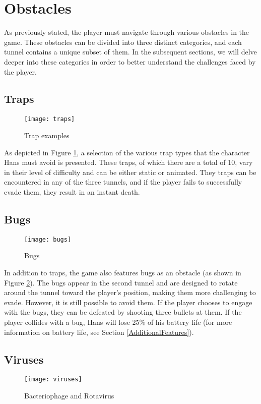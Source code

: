 \section{Obstacles}
As previously stated, the player must navigate through various obstacles in the game. These obstacles can be divided into three distinct categories, and each tunnel contains a unique subset of them. In the subsequent sections, we will delve deeper into these categories in order to better understand the challenges faced by the player.

\subsection{Traps}
\begin{figure}[h]
    \centering
    \texttt{[image: traps]}
    \caption{Trap examples}
    \label{fig:traps}
\end{figure}
As depicted in Figure \ref{fig:traps}, a selection of the various trap types that the character Hans must avoid is presented. These traps, of which there are a total of 10, vary in their level of difficulty and can be either static or animated. They traps can be encountered in any of the three tunnels, and if the player fails to successfully evade them, they result in an instant death.

\subsection{Bugs}
\label{Bugs}
\begin{figure}[h]
    \centering
    \texttt{[image: bugs]}
    \caption{Bugs}
    \label{fig:bugs}
\end{figure}
In addition to traps, the game also features bugs as an obstacle (as shown in Figure \ref{fig:bugs}). The bugs appear in the second tunnel and are designed to rotate around the tunnel toward the player's position, making them more challenging to evade. However, it is still possible to avoid them. If the player chooses to engage with the bugs, they can be defeated by shooting three bullets at them. If the player collides with a bug, Hans will lose 25\% of his battery life (for more information on battery life, see Section \ref{AdditionalFeatures}).

\subsection{Viruses}
\begin{figure}[h]
    \centering
    \texttt{[image: viruses]}
    \caption{Bacteriophage and Rotavirus}
    \label{fig:viruses}
\end{figure}

